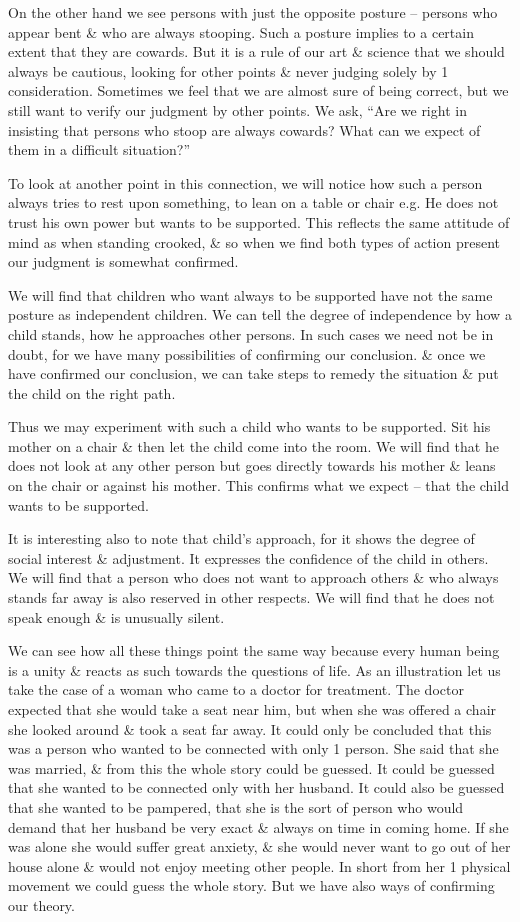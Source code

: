 \documentclass{article}
\begin{document}
On the other hand we see persons with just the opposite posture -- persons who appear bent \& who are always stooping. Such a posture implies to a certain extent that they are cowards. But it is a rule of our art \& science that we should always be cautious, looking for other points \& never judging solely by 1 consideration. Sometimes we feel that we are almost sure of being correct, but we still want to verify our judgment by other points. We ask, ``Are we right in insisting that persons who stoop are always cowards? What can we expect of them in a difficult situation?''

To look at another point in this connection, we will notice how such a person always tries to rest upon something, to lean on a table or chair e.g. He does not trust his own power but wants to be supported. This reflects the same attitude of mind as when standing crooked, \& so when we find both types of action present our judgment is somewhat confirmed.

We will find that children who want always to be supported have not the same posture as independent children. We can tell the degree of independence by how a child stands, how he approaches other persons. In such cases we need not be in doubt, for we have many possibilities of confirming our conclusion. \& once we have confirmed our conclusion, we can take steps to remedy the situation \& put the child on the right path.

Thus we may experiment with such a child who wants to be supported. Sit his mother on a chair \& then let the child come into the room. We will find that he does not look at any other person but goes directly towards his mother \& leans on the chair or against his mother. This confirms what we expect -- that the child wants to be supported.

It is interesting also to note that child's approach, for it shows the degree of social interest \& adjustment. It expresses the confidence of the child in others. We will find that a person who does not want to approach others \& who always stands far away is also reserved in other respects. We will find that he does not speak enough \& is unusually silent.

We can see how all these things point the same way because every human being is a unity \& reacts as such towards the questions of life. As an illustration let us take the case of a woman who came to a doctor for treatment. The doctor expected that she would take a seat near him, but when she was offered a chair she looked around \& took a seat far away. It could only be concluded that this was a person who wanted to be connected with only 1 person. She said that she was married, \& from this the whole story could be guessed. It could be guessed that she wanted to be connected only with her husband. It could also be guessed that she wanted to be pampered, that she is the sort of person who would demand that her husband be very exact \& always on time in coming home. If she was alone she would suffer great anxiety, \& she would never want to go out of her house alone \& would not enjoy meeting other people. In short from her 1 physical movement we could guess the whole story. But we have also ways of confirming our theory.
\end{document}
